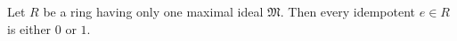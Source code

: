 Let $R$ be a ring having only one maximal ideal $\mathfrak{M}$. Then every idempotent $e \in R$ is either $0$ or $1$.
